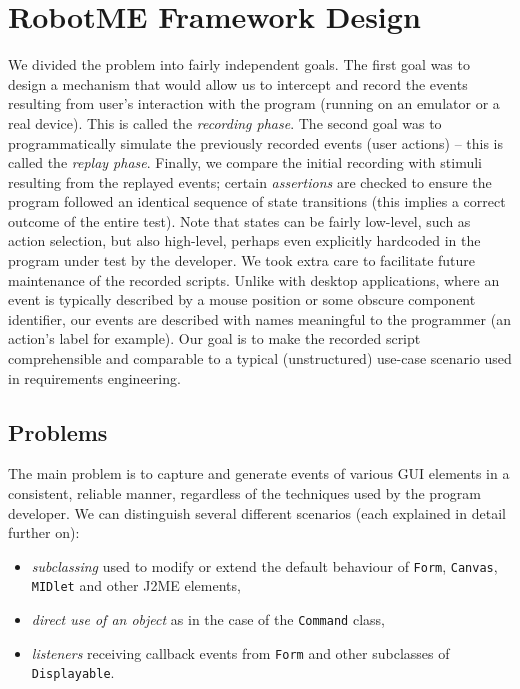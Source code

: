 
\chapter{RobotME Framework Design}

We divided the problem into fairly independent goals. The first goal was to design a mechanism
that would allow us to intercept and record the events resulting from user's interaction with the
program (running on an emulator or a real device). This is called the \emph{recording phase}. The 
second goal was to programmatically simulate the previously recorded events (user actions) -- this is
called the \emph{replay phase}. Finally, we compare the initial recording with stimuli 
resulting from the replayed events; certain \emph{assertions} are checked to ensure the program followed
an identical sequence of state transitions (this implies a correct outcome of the entire test). Note
that states can be fairly low-level, such as action selection, but also high-level, perhaps even
explicitly hardcoded in the program under test by the developer. We took extra care to  
facilitate future maintenance of the recorded scripts. Unlike with desktop applications, 
where an event is typically described by a mouse position or some obscure component identifier, 
our events are described with names meaningful to the programmer (an action's label 
for example). Our goal is to make the recorded script comprehensible and comparable to a 
typical (unstructured) use-case scenario used in requirements engineering.


\section{Problems}

The main problem is to capture and generate events of various GUI elements in a consistent, 
reliable manner, regardless of the techniques used by the program developer. We can distinguish
several different scenarios (each explained in detail further on):
\begin{itemize}
    \item \emph{subclassing} used to modify or extend the default behaviour of \texttt{Form}, \texttt{Canvas}, 
    \texttt{MIDlet} and other J2ME elements,
    
    \item \emph{direct use of an object} as in the case of the \texttt{Command} class,
    
    \item \emph{listeners} receiving callback events from \texttt{Form} and other 
    subclasses of \texttt{Displayable}.
\end{itemize}

